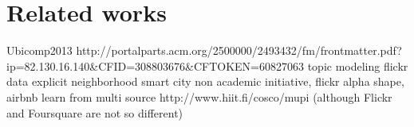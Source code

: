 \chapter{Related works}
\label{chap:related}

Ubicomp2013 http://portalparts.acm.org/2500000/2493432/fm/frontmatter.pdf?ip=82.130.16.140&CFID=308803676&CFTOKEN=60827063
topic modeling
flickr data
explicit neighborhood
smart city
non academic initiative, flickr alpha shape, airbnb
learn from multi source http://www.hiit.fi/cosco/mupi (although Flickr and
Foursquare are not so different)
